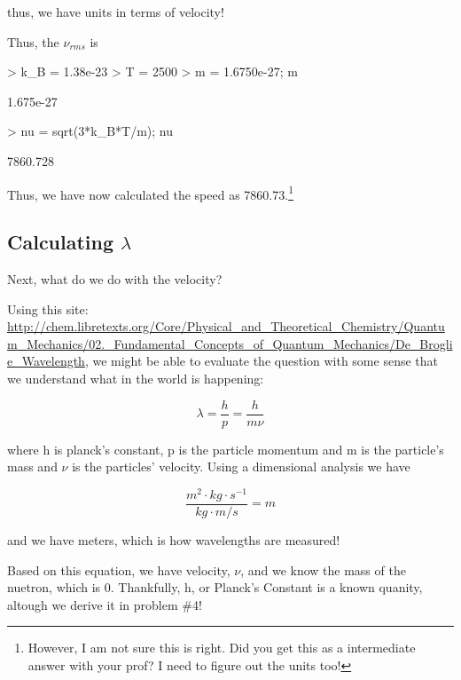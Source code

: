 \documentclass{article}
\begin{document}
\noindent thus, we have units in terms of velocity! 

Thus, the $\nu_{rms}$ is
\begin{Schunk}
\begin{Sinput}
> k_B = 1.38e-23
> T = 2500
> m = 1.6750e-27; m
\end{Sinput}
\begin{Soutput}
[1] 1.675e-27
\end{Soutput}
\begin{Sinput}
> nu = sqrt(3*k_B*T/m); nu
\end{Sinput}
\begin{Soutput}
[1] 7860.728
\end{Soutput}
\end{Schunk}

Thus, we have now calculated the speed as 7860.73.\footnote{However, I am not sure this is right. Did you get this as a intermediate answer with your prof? I need to figure out the units too!}

\subsection{Calculating $\lambda$}

Next, what do we do with the velocity?  

Using this site: \url{http://chem.libretexts.org/Core/Physical_and_Theoretical_Chemistry/Quantum_Mechanics/02._Fundamental_Concepts_of_Quantum_Mechanics/De_Broglie_Wavelength}, we might be able to evaluate the question with some sense that we understand what in the world is happening:

\begin{equation}
\lambda = \frac{h}{p} = \frac{h}{ m \nu}
\end{equation}

\noindent where h is planck's constant, p is the particle momentum and m is the particle's mass and $\nu$ is the particles' velocity. Using a dimensional analysis we have

\begin{equation}
\frac{m^2 \cdot kg \cdot s^{-1}}{kg \cdot m /s} = m  
\end{equation}

\noindent and we have meters, which is how wavelengths are measured!

Based on this equation, we have velocity, $\nu$, and we know the mass of the nuetron, which is 0. Thankfully, h, or Planck's Constant is a known quanity, altough we derive it in problem \#4!
\end{document}
